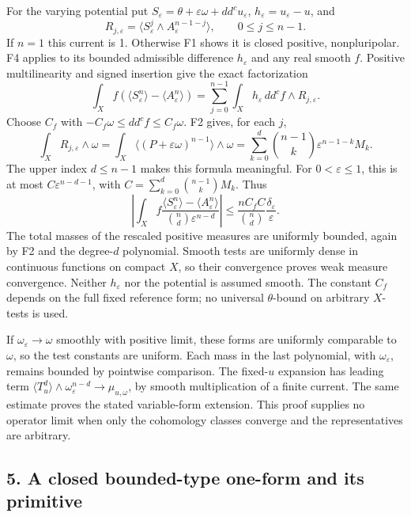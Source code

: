 \documentclass[
  10pt,
]{article}
\begin{document}
For the varying potential put
\(S_\varepsilon=\theta+\varepsilon\omega+dd^cu_\varepsilon\),
\(h_\varepsilon=u_\varepsilon-u\), and \[
R_{j,\varepsilon}=\langle S_\varepsilon^j\wedge A_\varepsilon^{n-1-j}\rangle,\qquad 0\leq j\leq n-1.
\] If \(n=1\) this current is 1. Otherwise F1 shows it is closed
positive, nonpluripolar. F4 applies to its bounded admissible difference
\(h_\varepsilon\) and any real smooth \(f\). Positive multilinearity and
signed insertion give the exact factorization \[
\int_X f(\langle S_\varepsilon^n\rangle-\langle A_\varepsilon^n\rangle)
=\sum_{j=0}^{n-1}\int_X h_\varepsilon\,dd^cf\wedge R_{j,\varepsilon}.
\] Choose \(C_f\) with \(-C_f\omega\leq dd^cf\leq C_f\omega\). F2 gives,
for each \(j\), \[
\int_X R_{j,\varepsilon}\wedge\omega
=\int_X\langle(P+\varepsilon\omega)^{n-1}\rangle\wedge\omega
=\sum_{k=0}^{d}\binom{n-1}k\varepsilon^{n-1-k}M_k.
\] The upper index \(d\leq n-1\) makes this formula meaningful. For
\(0<\varepsilon\leq1\), this is at most \(C\varepsilon^{n-d-1}\), with
\(C=\sum_{k=0}^d\binom{n-1}kM_k\). Thus \[
\left|\int_X f\frac{\langle S_\varepsilon^n\rangle-\langle A_\varepsilon^n\rangle}{\binom nd\varepsilon^{n-d}}\right|
\leq\frac{n C_f C}{\binom nd}\frac{\delta_\varepsilon}{\varepsilon}.
\] The total masses of the rescaled positive measures are uniformly
bounded, again by F2 and the degree-\(d\) polynomial. Smooth tests are
uniformly dense in continuous functions on compact \(X\), so their
convergence proves weak measure convergence. Neither \(h_\varepsilon\)
nor the potential is assumed smooth. The constant \(C_f\) depends on the
full fixed reference form; no universal \(\theta\)-bound on arbitrary
\(X\)-tests is used.

If \(\omega_\varepsilon\to\omega\) smoothly with positive limit, these
forms are uniformly comparable to \(\omega\), so the test constants are
uniform. Each mass in the last polynomial, with \(\omega_\varepsilon\),
remains bounded by pointwise comparison. The fixed-\(u\) expansion has
leading term
\(\langle T_u^d\rangle\wedge\omega_\varepsilon^{n-d}\to\mu_{u,\omega}\),
by smooth multiplication of a finite current. The same estimate proves
the stated variable-form extension. This proof supplies no operator
limit when only the cohomology classes converge and the representatives
are arbitrary.

\subsection{5. A closed bounded-type one-form and its
primitive}\label{a-closed-bounded-type-one-form-and-its-primitive}
\end{document}
